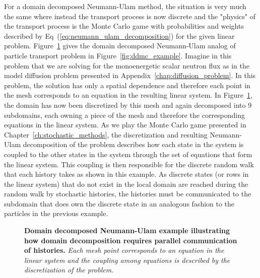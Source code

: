For a domain decomposed Neumann-Ulam method, the situation is very
much the same where instead the transport process is now discrete and
the "physics" of the transport process is the Monte Carlo game with
probabilities and weights described by
Eq~(\ref{eq:neumann_ulam_decomposition}) for the given linear
problem. Figure~\ref{fig:ddnu_example} gives the domain decomposed
Neumann-Ulam analog of particle transport problem in
Figure~\ref{fig:ddmc_example}. Imagine in this problem that we are
solving for the monoenergetic scalar neutron flux as in the model
diffusion problem presented in Appendix~\ref{chap:diffusion_problem}.
In this problem, the solution has only a spatial dependence and
therefore each point in the mesh corresponds to an equation in the
resulting linear system. In Figure~\ref{fig:ddnu_example}, the domain
has now been discretized by this mesh and again decomposed into 9
subdomains, each owning a piece of the mesh and therefore the
corresponding equations in the linear system. As we play the Monte
Carlo game presented in Chapter~\ref{ch:stochastic_methods}, the
discretization and resulting Neumann-Ulam decomposition of the problem
describes how each state in the system is coupled to the other states
in the system through the set of equations that form the linear
system. This coupling is then responsible for the discrete random walk
that each history takes as shown in this example. As discrete states
(or rows in the linear system) that do not exist in the local domain
are reached during the random walk by stochastic histories, the
histories must be communicated to the subdomain that does own the
discrete state in an analogous fashion to the particles in the
previous example.
\begin{figure}[t!]
  \begin{center}
    \scalebox{1.5}{
       }
  \end{center}
  \caption{\textbf{Domain decomposed Neumann-Ulam example illustrating
      how domain decomposition requires parallel communication of
      histories.} \textit{Each mesh point corresponds to an equation
      in the linear system and the coupling among equations is
      described by the discretization of the problem.}}
  \label{fig:ddnu_example}
\end{figure}

